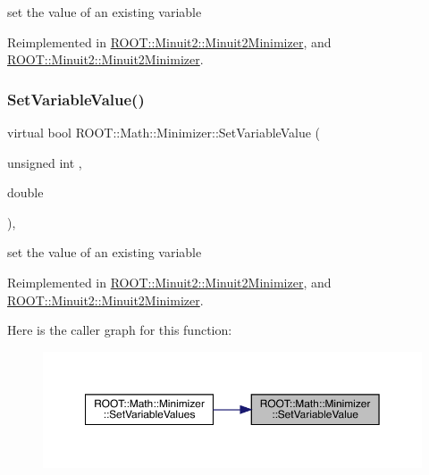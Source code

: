 set the value of an existing variable 



Reimplemented in \mbox{\hyperlink{classROOT_1_1Minuit2_1_1Minuit2Minimizer_a474e05b30c1227e9cc39fb597027f426}{R\+O\+O\+T\+::\+Minuit2\+::\+Minuit2\+Minimizer}}, and \mbox{\hyperlink{classROOT_1_1Minuit2_1_1Minuit2Minimizer_a474e05b30c1227e9cc39fb597027f426}{R\+O\+O\+T\+::\+Minuit2\+::\+Minuit2\+Minimizer}}.

\mbox{\label{classROOT_1_1Math_1_1Minimizer_a47e9a16c7a0b4ecfe769ee4be048d5c3}} 
\subsubsection{\texorpdfstring{SetVariableValue()}{SetVariableValue()}\hspace{0.1cm}{\footnotesize\ttfamily [2/2]}}
{\footnotesize\ttfamily virtual bool R\+O\+O\+T\+::\+Math\+::\+Minimizer\+::\+Set\+Variable\+Value (\begin{DoxyParamCaption}\item[{unsigned int}]{,  }\item[{double}]{ }\end{DoxyParamCaption})\hspace{0.3cm}{\ttfamily [inline]}, {\ttfamily [virtual]}}



set the value of an existing variable 



Reimplemented in \mbox{\hyperlink{classROOT_1_1Minuit2_1_1Minuit2Minimizer_a474e05b30c1227e9cc39fb597027f426}{R\+O\+O\+T\+::\+Minuit2\+::\+Minuit2\+Minimizer}}, and \mbox{\hyperlink{classROOT_1_1Minuit2_1_1Minuit2Minimizer_a474e05b30c1227e9cc39fb597027f426}{R\+O\+O\+T\+::\+Minuit2\+::\+Minuit2\+Minimizer}}.

Here is the caller graph for this function\+:\nopagebreak
\begin{figure}[H]
\begin{center}
\leavevmode
\includegraphics[width=350pt]{dc/dc4/classROOT_1_1Math_1_1Minimizer_a47e9a16c7a0b4ecfe769ee4be048d5c3_icgraph}
\end{center}
\end{figure}
\mbox{\label{classROOT_1_1Math_1_1Minimizer_ac8368efbd59da8e0b8bc0a0966309609}} 
